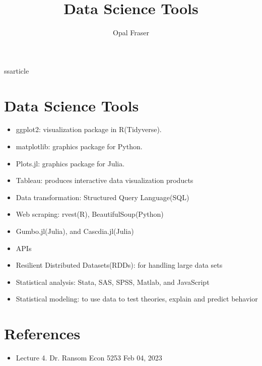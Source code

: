 ss{article}

\usepackage[english]{babel}

\usepackage[letterpaper,top=2cm,bottom=2cm,left=3cm,right=3cm,marginparwidth=1.75cm]{geometry}

\usepackage{amsmath}
\usepackage{graphicx}
\usepackage[colorlinks=true, allcolors=blue]{hyperref}

\title{Data Science Tools}
\author{Opal Fraser}


\maketitle



\section{Data Science Tools}

\begin{itemize}
\item ggplot2: visualization package in R(Tidyverse).   
\item matplotlib: graphics package for Python. 
\item Plots.jl: graphics package for Julia. 
\item Tableau: produces interactive data visualization products
\item Data transformation: Structured Query Language(SQL)
\item Web scraping: rvest(R), BeautifulSoup(Python) 
\item Gumbo.jl(Julia), and Cascdia.jl(Julia)
\item APIs
\item Resilient Distributed Datasets(RDDs): for handling large data sets 
\item Statistical analysis: Stata, SAS, SPSS, Matlab, and JavaScript
\item Statistical modeling: to use data to test theories, explain and predict behavior 
\end{itemize}

\section{References}
\begin{itemize}
\item Lecture 4. 
Dr. Ransom 
Econ 5253 
Feb 04, 2023
\end{itemize}



